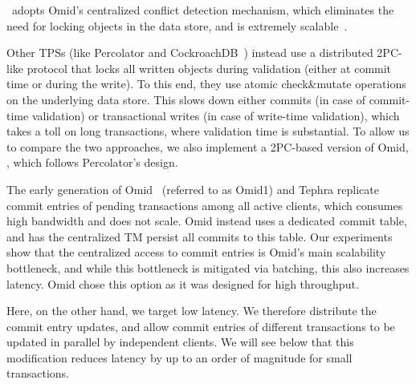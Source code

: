 \sysll\ adopts Omid's centralized conflict detection mechanism, which eliminates the need for locking objects
in the data store, and is extremely scalable~\cite{Omid2017}. 

Other TPSs (like Percolator and  CockroachDB~\cite{cockroach}) instead use a distributed 2PC-like protocol that locks all written objects during validation (either at commit time or during the write). To this end, they use atomic check\&mutate operations on the underlying data store. This slows down either commits (in case of commit-time validation) or transactional writes (in case of write-time validation), which takes a toll on long transactions, where validation time is substantial. 
%
To allow us to compare the two approaches, we also implement a 2PC-based version of Omid, \syspc,
which follows Percolator's design.

%
The early generation of Omid~\cite{OmidICDE2014} (referred to as Omid1) and Tephra replicate commit entries 
of pending transactions among all active clients, which consumes high bandwidth and does not scale. Omid 
instead uses a dedicated {\emph commit table}, and 
has the centralized TM persist all commits to this table. 
Our experiments show that the centralized access to commit entries is Omid's main scalability bottleneck, 
and while this bottleneck is mitigated via batching, this also increases latency.
Omid chose this  option as it was designed for high throughput. 

Here, on the other hand, we target  low latency. 
We therefore distribute the commit entry updates, and allow commit entries of different transactions to be 
updated in parallel by independent clients. We will see below that this modification reduces latency
by up to an order of magnitude for small transactions.

